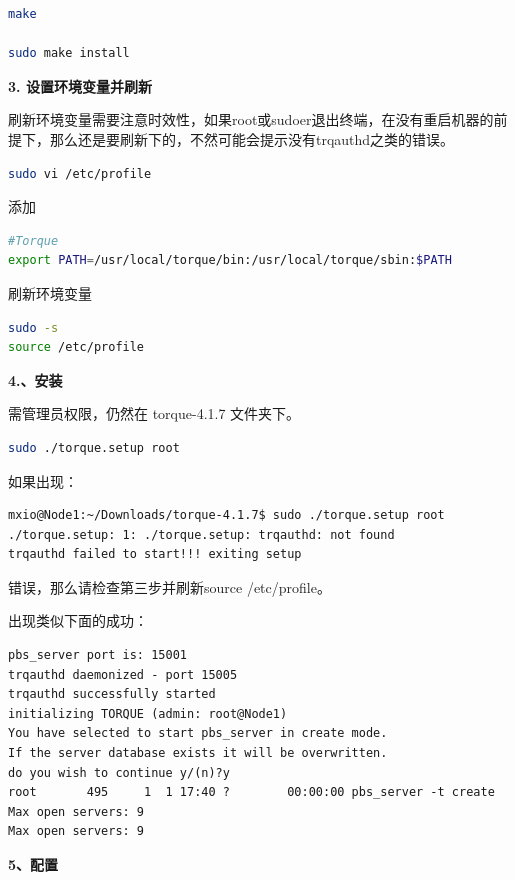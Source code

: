 {\begin{lstlisting}[language=sh]
make

sudo make install
\end{lstlisting}

\textbf{3. 设置环境变量并刷新}

刷新环境变量需要注意时效性，如果root或sudoer退出终端，在没有重启机器的前提下，那么还是要刷新下的，不然可能会提示没有trqauthd之类的错误。
\begin{lstlisting}[language=sh]
sudo vi /etc/profile
\end{lstlisting}
添加
\begin{lstlisting}[language=sh]
#Torque
export PATH=/usr/local/torque/bin:/usr/local/torque/sbin:$PATH
\end{lstlisting}
刷新环境变量
\begin{lstlisting}[language=sh]
sudo -s
source /etc/profile
\end{lstlisting}

\textbf{4.、安装}

需管理员权限，仍然在 torque-4.1.7 文件夹下。
\begin{lstlisting}[language=sh]
sudo ./torque.setup root
\end{lstlisting}
如果出现：
\begin{verbatim}
mxio@Node1:~/Downloads/torque-4.1.7$ sudo ./torque.setup root
./torque.setup: 1: ./torque.setup: trqauthd: not found
trqauthd failed to start!!! exiting setup 
\end{verbatim}
错误，那么请检查第三步并刷新source /etc/profile。

出现类似下面的成功：
\begin{verbatim}
pbs_server port is: 15001
trqauthd daemonized - port 15005
trqauthd successfully started
initializing TORQUE (admin: root@Node1)
You have selected to start pbs_server in create mode.
If the server database exists it will be overwritten.
do you wish to continue y/(n)?y
root       495     1  1 17:40 ?        00:00:00 pbs_server -t create
Max open servers: 9
Max open servers: 9
\end{verbatim}


\textbf{5、配置}

}
